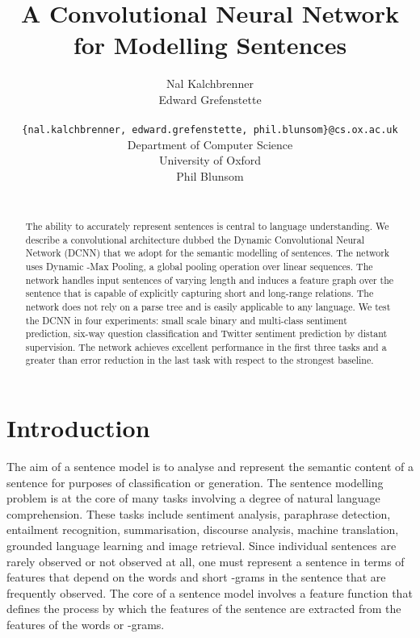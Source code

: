 \documentclass[11pt]{article}
\title{A Convolutional Neural Network for Modelling Sentences}
\author{Nal Kalchbrenner \\\And Edward Grefenstette\\  \\ {\tt\small \{nal.kalchbrenner, edward.grefenstette, phil.blunsom\}@cs.ox.ac.uk}\\{Department of Computer Science} \\{University of Oxford}\\\And
  Phil Blunsom \\
\\}
\date{}
\begin{document}
\maketitle
\begin{abstract}

The ability to accurately represent sentences is central to language understanding. We describe a convolutional architecture dubbed the Dynamic Convolutional Neural Network (DCNN) that we adopt for the semantic modelling of sentences. The network uses Dynamic -Max Pooling, a global pooling operation over linear sequences. The network handles input sentences of varying length and induces a feature graph over the sentence that  is capable of explicitly capturing short and long-range relations. The network does not rely on a parse tree and is easily applicable to any language. We test the DCNN in four experiments: small scale binary and multi-class sentiment prediction, six-way question classification and Twitter sentiment prediction by distant supervision. The network achieves excellent performance in the first three tasks and a greater than  error reduction in the last task with respect to the strongest baseline.  


\end{abstract}



\section{Introduction}


The aim of a sentence model is to analyse and represent the semantic content of a sentence for purposes of classification or generation. The sentence modelling problem is at the core of many tasks involving a degree of natural language comprehension. These tasks include sentiment analysis, paraphrase detection, entailment recognition, summarisation, discourse analysis, machine translation, grounded language learning and image retrieval.
Since individual sentences are rarely observed or not observed at all, one must represent a sentence in terms of features that depend on the words and short -grams in the sentence that are frequently observed. The core of a sentence model  involves a {feature function} that defines the process by which the features of the sentence are extracted from the features of the words or -grams.
\end{document}
